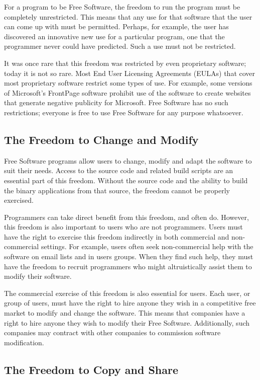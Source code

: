 \documentclass[12pt]{report}
\begin{document}
For a program to be Free Software, the freedom to run the program must be
completely unrestricted.  This means that any use for that software that
the user can come up with must be permitted.  Perhaps, for example, the
user has discovered an innovative new use for a particular program, one
that the programmer never could have predicted.  Such a use must not be
restricted.

It was once rare that this freedom was restricted by even proprietary
software; today it is not so rare.  Most End User Licensing Agreements
(EULAs) that cover most proprietary software restrict some types of use.
For example, some versions of Microsoft's FrontPage software prohibit use
of the software to create websites that generate negative publicity for
Microsoft.  Free Software has no such restrictions; everyone is free to
use Free Software for any purpose whatsoever.

\subsection{The Freedom to Change and Modify}

Free Software programs allow users to change, modify and adapt the
software to suit their needs.  Access to the source code and related build
scripts are an essential part of this freedom.  Without the source code
and the ability to build the binary applications from that source, the
freedom cannot be properly exercised.

Programmers can take direct benefit from this freedom, and often do.
However, this freedom is also important to users who are not programmers.
Users must have the right to exercise this freedom indirectly in both
commercial and non-commercial settings.  For example, users often seek
non-commercial help with the software on email lists and in users groups.
When they find such help, they must have the freedom to recruit
programmers who might altruistically assist them to modify their software.

The commercial exercise of this freedom is also essential for users.  Each
user, or group of users, must have the right to hire anyone they wish in a
competitive free market to modify and change the software.  This means
that companies have a right to hire anyone they wish to modify their Free
Software.  Additionally, such companies may contract with other companies
to commission software modification.

\subsection{The Freedom to Copy and Share}
\end{document}
